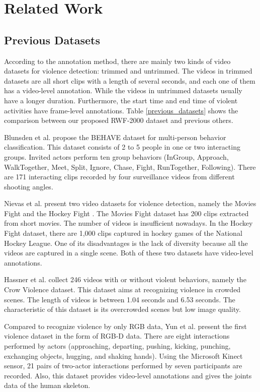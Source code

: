 \documentclass[a4paper,conference]{IEEEtran}
\begin{document}
\section{Related Work}
\subsection{Previous Datasets}
\label{other_datasets}

According to the annotation method, there are mainly two kinds of video datasets for violence detection: trimmed and untrimmed. The videos in trimmed datasets are all short clips with a length of several seconds, and each one of them has a video-level annotation. While the videos in untrimmed datasets usually have a longer duration. Furthermore, the start time and end time of violent activities have frame-level annotations. Table \ref{previous_datasets} shows the comparison between our proposed RWF-2000 dataset and previous others. 

Blunsden et al. \cite{behave} propose the BEHAVE dataset for multi-person behavior classification. This dataset consists of 2 to 5 people in one or two interacting groups. Invited actors perform ten group behaviors (InGroup, Approach, WalkTogether, Meet, Split, Ignore, Chase, Fight, RunTogether, Following). There are 171 interacting clips recorded by four surveillance videos from different shooting angles.

Nievas et al. present two video datasets for violence detection, namely the Movies Fight \cite{nievas2011movies} and the Hockey Fight \cite{nievas2011hockey}. The Movies Fight dataset has 200 clips extracted from short movies. The number of videos is insufficient nowadays. In the Hockey Fight dataset, there are 1,000 clips captured in hockey games of the National Hockey League. One of its disadvantages is the lack of diversity because all the videos are captured in a single scene. Both of these two datasets have video-level annotations.

Hassner et al. \cite{r3} collect 246 videos with or without violent behaviors, namely the Crow Violence dataset. This dataset aims at recognizing violence in crowded scenes. The length of videos is between 1.04 seconds and 6.53 seconds. The characteristic of this dataset is its overcrowded scenes but low image quality.

Compared to recognize violence by only RGB data, Yun et al. \cite{sbu} present the first violence dataset in the form of RGB-D data. There are eight interactions performed by actors (approaching, departing, pushing, kicking, punching, exchanging objects, hugging, and shaking hands). Using the Microsoft Kinect sensor, 21 pairs of two-actor interactions performed by seven participants are recorded. Also, this dataset provides video-level annotations and gives the joints data of the human skeleton.
\end{document}
